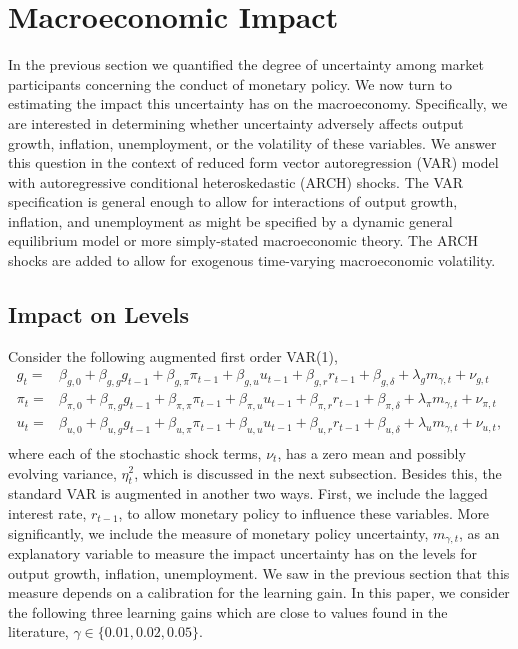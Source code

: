 \documentclass[12pt]{article}
\newcommand{\beq}{\begin{equation}}
\newcommand{\eeq}{\end{equation}}
\begin{document}
\section{Macroeconomic Impact}
In the previous section we quantified the degree of uncertainty among market participants concerning the conduct of monetary policy.  We now turn to estimating the impact this uncertainty has on the macroeconomy.  Specifically, we are interested in determining whether uncertainty adversely affects output growth, inflation, unemployment, or the volatility of these variables.  We answer this question in the context of reduced form vector autoregression (VAR) model with autoregressive conditional heteroskedastic (ARCH) shocks.  The VAR specification is general enough to allow for interactions of output growth, inflation, and unemployment as might be specified by a dynamic general equilibrium model or more simply-stated macroeconomic theory.  The ARCH shocks are added to allow for exogenous time-varying macroeconomic volatility.  

\subsection{Impact on Levels}
Consider the following augmented first order VAR(1),
\beq \label{eq:var} \begin{array}{cc}
g_t = & \beta_{g,0} + \beta_{g,g} g_{t-1} + \beta_{g,\pi} \pi_{t-1} + \beta_{g,u} u_{t-1} + \beta_{g,r} r_{t-1} + \beta_{g,\delta} + \lambda_{g} m_{\gamma,t}+ \nu_{g,t} \\ [0.5pc]
\pi_t = & \beta_{\pi,0} + \beta_{\pi,g} g_{t-1} + \beta_{\pi,\pi} \pi_{t-1} + \beta_{\pi,u} u_{t-1} + \beta_{\pi,r} r_{t-1} + \beta_{\pi,\delta} + \lambda_{\pi} m_{\gamma,t}+ \nu_{\pi,t} \\ [0.5pc]
u_t = & \beta_{u,0} + \beta_{u,g} g_{t-1} + \beta_{u,\pi} \pi_{t-1} + \beta_{u,u} u_{t-1} + \beta_{u,r} r_{t-1} + \beta_{u,\delta} + \lambda_{u} m_{\gamma,t}+ \nu_{u,t}, \\ 
\end{array} \eeq
where each of the stochastic shock terms, $\nu_{t}$, has a zero mean and possibly evolving variance, $\eta_{t}^2$, which is discussed in the next subsection.  Besides this, the standard VAR is augmented in another two ways.  First, we include the lagged interest rate, $r_{t-1}$, to allow monetary policy to influence these variables.  More significantly, we include the measure of monetary policy uncertainty, $m_{\gamma,t}$, as an explanatory variable to measure the impact uncertainty has on the levels for output growth, inflation, unemployment.  We saw in the previous section that this measure depends on a calibration for the learning gain.  In this paper, we consider the following three learning gains which are close to values found in the literature, $\gamma \in \{0.01, 0.02, 0.05\}$.
\end{document}
